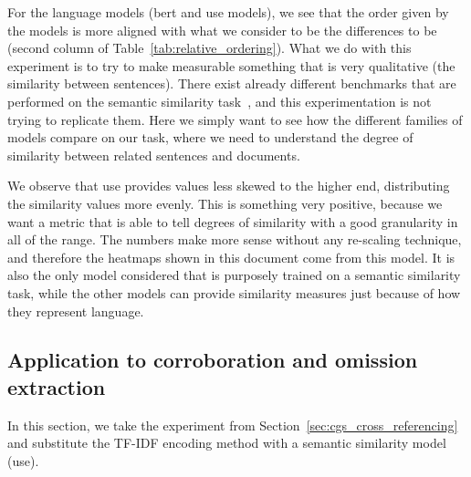 For the language models (\acrshort{bert} and \acrshort{use} models), we see that the order given by the models is more aligned with what we consider to be the differences to be (second column of Table~\ref{tab:relative_ordering}).
What we do with this experiment is to try to make measurable something that is very qualitative (the similarity between sentences).
There exist already different benchmarks that are performed on the semantic similarity task~\citep{conneau-kiela-2018-senteval,chandrasekaran2021evolution}, and this experimentation is not trying to replicate them. Here we simply want to see how the different families of models compare on our task, where we need to understand the degree of similarity between related sentences and documents.

We observe that \acrshort{use} provides values less skewed to the higher end, distributing the similarity values more evenly.
This is something very positive, because we want a metric that is able to tell degrees of similarity with a good granularity in all of the range.
The numbers make more sense without any re-scaling technique, and therefore the heatmaps shown in this document come from this model.
It is also the only model considered that is purposely trained on a semantic similarity task, while the other models can provide similarity measures just because of how they represent language.



\subsection{\statusred Application to corroboration and omission extraction}
\label{ssec:cgs_similarity_cliques}


In this section, we take the experiment from Section~\ref{sec:cgs_cross_referencing} and substitute the TF-IDF encoding method with a semantic similarity model (\acrshort{use}).

